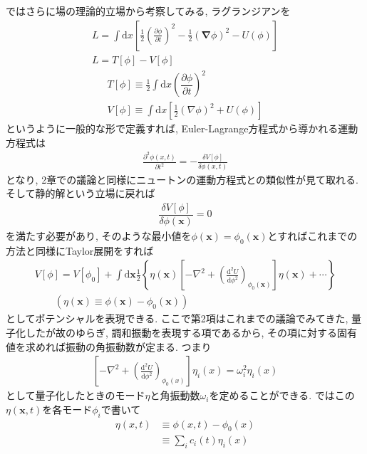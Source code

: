 \documentclass[dvipdfmx,11pt,a4paper,oneside,openany]{jsbook}
\begin{document}
ではさらに場の理論的立場から考察してみる, ラグランジアンを
\begin{align}
    L=\int \mathrm{d} x\left[\frac{1}{2}\left(\frac{\partial \phi}{\partial t}\right)^{2}-\frac{1}{2}(\boldsymbol{\nabla} \phi)^{2}-U(\phi)\right]\nonumber \\
    L=T[\phi]-V[\phi]
\end{align}
\begin{subequations}
    \begin{align}
        T[\phi]\equiv\frac{1}{2}\int \mathrm{d}x\left(\dfrac{\partial \phi}{\partial t}\right)^2 \\
        V[\phi] \equiv \int \mathrm{d} x\left[\frac{1}{2}(\nabla \phi)^{2}+U(\phi)\right]
    \end{align}
\end{subequations}
というように一般的な形で定義すれば, Euler-Lagrange方程式から導かれる運動方程式は
\begin{align}
    \frac{\partial^{2} \phi(x, t)}{\partial t^{2}}=-\frac{\delta V[\phi]}{\delta \phi(x, t)}
\end{align}
となり, 2章での議論と同様にニュートンの運動方程式との類似性が見て取れる. そして静的解という立場に戻れば
\begin{align}
    \dfrac{\delta V[\phi]}{\delta \phi(\bm{x})}=0
\end{align}
を満たす必要があり, そのような最小値を$\phi(\bm{x})=\phi_0(\bm{x})$とすればこれまでの方法と同様にTaylor展開をすれば
\begin{align}
    V[\phi]=V\left[\phi_{0}\right]+\int \mathrm{d} \bm{x} \frac{1}{2}\left\{\eta(\bm{x})\left[-\nabla^{2}+\left(\frac{\mathrm{d}^{2} U}{\mathrm{d} \phi^{2}}\right)_{\phi_{0}(\bm{x})}\right] \eta(\bm{x})+\cdots\right\}\label{eq:5.23} \\
    \qquad \left(\eta(\bm{x})\equiv \phi(\bm{x})-\phi_0(\bm{x})\right)\nonumber
\end{align}
としてポテンシャルを表現できる. ここで第2項はこれまでの議論でみてきた, 量子化したが故のゆらぎ, 調和振動を表現する項であるから, その項に対する固有値を求めれば振動の角振動数が定まる. つまり
\begin{align}
    \left[-\nabla^{2}+\left(\frac{\mathrm{d}^{2} U}{\mathrm{d} \phi^{2}}\right)_{\phi_{0}(x)}\right] \eta_{i}(x)=\omega_{i}^{2} \eta_{i}(x)\label{eq:5.24}
\end{align}
として量子化したときのモード$\eta$と角振動数$\omega_i$を定めることができる. ではこの$\eta(\bm{x},t)$を各モード$\phi_i$で書いて
\begin{align}
    \eta(x, t) & \equiv \phi(x, t)-\phi_{0}(x)\nonumber \\
               & \equiv \sum_{i} c_{i}(t) \eta_{i}(x)
\end{align}
\end{document}
